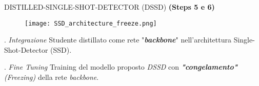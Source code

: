 \begin{frame}{DISTILLED-SINGLE-SHOT-DETECTOR (DSSD)}
    {\bfseries{\scriptsize{(Steps 5 e 6)}}}
    \begin{figure}
        \centering
        \texttt{[image: SSD\_architecture\_freeze.png]}
        \centering
    \end{figure}
    \begin{minipage}{\linewidth}
        \centering
        \begin{minipage}{0.45\linewidth}
            \begin{block}{. \emph{Integrazione}}
                Studente distillato come rete "{\bfseries{\emph{backbone}}}" nell'architettura {Single-Shot-Detector (SSD)}.    
            \end{block}
        \end{minipage}
        \hspace{0.5cm}
        \begin{minipage}{0.45\linewidth}
            \begin{block}{. \emph{Fine Tuning}}
                Training del modello proposto \emph{DSSD} con {\bfseries{\emph{"congelamento"}}} \emph{(Freezing)} della rete \emph{backbone}.
            \end{block}
        \end{minipage}
    \end{minipage}   
\end{frame}

